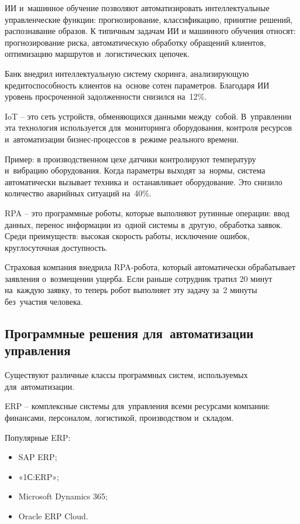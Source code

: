 \documentclass{ou}
\begin{document}
ИИ и~машинное обучение позволяют автоматизировать интеллектуальные управленческие функции: прогнозирование, классификацию, принятие решений, распознавание образов. К типичным задачам ИИ и машинного обучения относят: прогнозирование риска, автоматическую обработку обращений клиентов, оптимизацию маршрутов и~логистических цепочек.

Банк внедрил интеллектуальную систему скоринга, анализирующую кредитоспособность клиентов на~основе сотен параметров. Благодаря ИИ уровень просроченной задолженности снизился на~12\%.

IoT -- это сеть устройств, обменяющихся данными между~собой. В~управлении эта технология используется для~мониторинга оборудования, контроля ресурсов и~автоматизации бизнес-процессов в~режиме реального времени.

Пример: в производственном цехе датчики контролируют температуру и~вибрацию оборудования. Когда параметры выходят за~нормы, система автоматически вызывает техника и~останавливает оборудование. Это снизило количество аварийных ситуаций на~40\%.

RPA -- это программные роботы, которые выполняют рутинные операции: ввод данных, перенос информации из~одной системы в~другую, обработка заявок. Среди преимуществ: высокая скорость работы, исключение ошибок, круглосуточная доступность.

Страховая компания внедрила RPA-робота, который автоматически обрабатывает заявления о~возмещении ущерба. Если раньше сотрудник тратил 20 минут на~каждую заявку, то теперь робот выполняет эту задачу за~2 минуты без~участия человека.
\subsection{Программные решения для~автоматизации управления}
Существуют различные классы программных систем, используемых для~автоматизации.

ERP -- комплексные системы для~управления всеми ресурсами компании: финансами, персоналом, логистикой, производством и~складом.

Популярные ERP:
\begin{itemize}[label=-, leftmargin=0em, itemindent=3.35em, nosep]
\item SAP ERP;
\item «1С:ERP»;
\item Microsoft Dynamics 365;
\item Oracle ERP Cloud.
\end{itemize}
\end{document}
